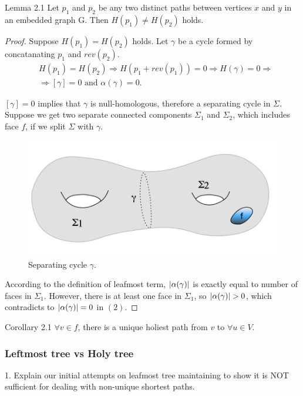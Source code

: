\documentclass{article}
\begin{document}
\begin{oneshot}{Lemma 2.1}
Let $p_1$ and $p_2$ be any two distinct paths between vertices $x$ and $y$ in an embedded graph G. Then $H(p_1) \neq H(p_2)$ holds. 
\end{oneshot}
\begin{proof}
Suppose $H(p_1) = H(p_2)$ holds. Let $\gamma$ be a cycle formed by concatanating $p_1$ and $rev(p_2)$.
\begin{align}
& H(p_1) = H(p_2) \Rightarrow H(p_1 + rev(p_1)) = 0 \Rightarrow  H(\gamma) = 0 \Rightarrow \\
&  \Rightarrow [\gamma] = 0 \text{ and } \alpha(\gamma) = 0.
\end{align}

$[\gamma] = 0$ implies that $\gamma$ is null-homologous, therefore a separating cycle in $\Sigma$. Suppose we get two separate connected components $\Sigma_1$ and $\Sigma_2$, which includes face $f$, if we split $\Sigma$ with $\gamma$. \\

\begin{figure}[H]
  \label{fig: g2_separating_cycle}
  \centering
  \includegraphics[scale = 0.5]{figures/g2_separating_cycle.png}
  \caption{Separating cycle $\gamma$.}
\end{figure}

According to the definition of leafmost term, $\mathopen| \alpha(\gamma) \mathclose|$ is exactly equal to number of faces in $\Sigma_1$. However, there is at least one face in $\Sigma_1$, so $\mathopen| \alpha(\gamma) \mathclose| > 0$, which contradicts to $\mathopen| \alpha(\gamma) \mathclose| = 0$ in $(2)$.
\end{proof}

\begin{oneshot}{Corollary 2.1}
$\forall v \in f$, there is a unique holiest path from $v$ to $\forall u \in V$.
\end{oneshot}

\subsubsection{Leftmost tree vs Holy tree}
\begin{center}
{\color{red}
1. Explain our initial attempts on leafmost tree maintaining to show it is NOT
sufficient for dealing with non-unique shortest paths.}
\end{center}
\end{document}
